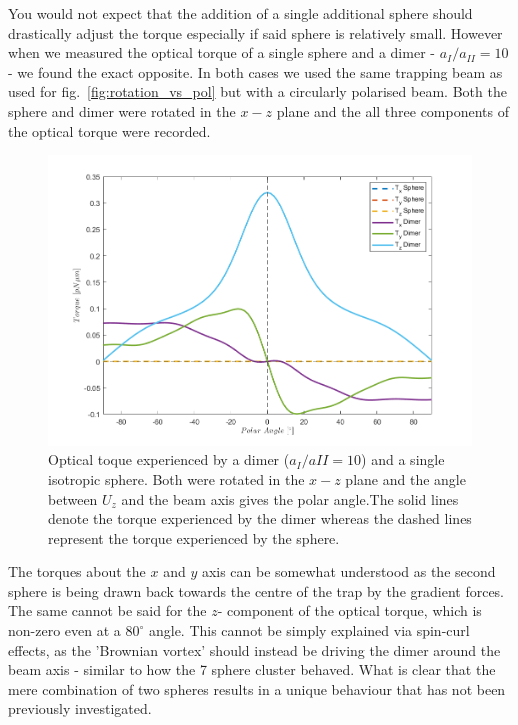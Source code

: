 You would not expect that the addition of a single additional 
sphere should drastically adjust the torque especially if said 
sphere is relatively small. However when we measured the optical 
torque of a single sphere and a dimer - $a_{I}/a_{II}=10$ - we 
found the exact opposite. In both cases we used the same trapping 
beam as used for fig.~\ref{fig:rotation_vs_pol} but with a 
circularly polarised beam. Both the sphere and dimer were rotated 
in the $x-z$ plane and the all three components of the optical 
torque were recorded.
\begin{figure}[h!]
	\centering	
	\includegraphics[width=\linewidth]{sphere_dimer_torque.png}
	\caption{Optical toque experienced by a dimer ($a_{I}/a
	{II}=10$) and a single isotropic sphere. Both were rotated 
	in the $x-z$ plane and the angle between $U_z$ and the beam 
	axis gives the polar angle.The solid lines denote the torque 
	experienced by the dimer whereas the dashed lines represent 
	the torque experienced by the sphere.}
	\label{fig:sphere_dimer_torque}
\end{figure}
 
The torques about the $x$ and $y$ axis can be somewhat understood 
as the second sphere is being drawn back towards the centre of the 
trap by the gradient forces. The same cannot be said for the $z$-
component of the optical torque, which is non-zero even at a 
$80^\circ$ angle. This cannot be simply explained via spin-curl 
effects, as the 'Brownian vortex' should instead be driving the
dimer around the beam axis - similar to how the 7 sphere cluster 
behaved. What is clear that the mere combination of two spheres
results in a unique behaviour that has not been previously 
investigated. 

